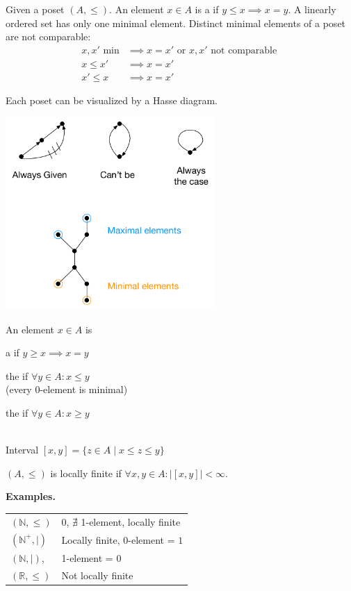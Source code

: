 \begin{definition}
Given a poset $(A, \leq)$.
An element $x \in A$ is a  if $y \leq x \implies x=y$. A linearly ordered set has only one minimal element. Distinct minimal elements of a poset are not comparable:
\begin{align*}
  x,x' \text{ min} &\implies x=x' \text{ or } x,x' \text{ not comparable }\\
  x ≤ x'           &\implies x = x'\\
  x' ≤ x           &\implies x = x'
\end{align*}

Each poset can be visualized by a Hasse diagram.

\begin{center}
    \includegraphics[width=0.6\textwidth]{02_higher_combinatorics/pics/Lattice}
\end{center}

An element $x \in A$ is
\begin{compactitem}
  \item a  if $y \geq x \implies x=y$
  \item the  if $\forall y \in A : x \leq y$ \\
    (every 0-element is minimal)
  \item the  if $\forall y \in A : x \geq y$
\end{compactitem}~\\
Interval $[x,y] = \{z \in A \mid x \leq z \leq y\}$

$(A, \leq)$ is locally finite if $\forall x,y \in A: | [x,y]| < \infty$.
\end{definition}

\textbf{Examples.} \\
\begin{tabular}{ll}
  $(\mathbb{N}, \leq)$
    & 0, $\nexists$ 1-element, locally finite \\
  $(\mathbb{N}^{+}, \mid)$
    & Locally finite, 0-element = $1$ \\
  $(\mathbb{N}, \mid)$,
    & 1-element = $0$ \\
  $(\mathbb{R}, \leq)$
    & Not locally finite
\end{tabular}

